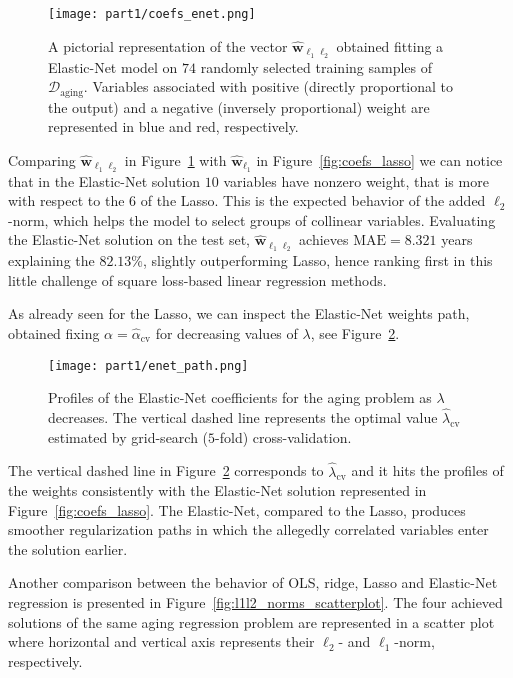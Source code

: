 			\begin{figure}[!h]
				\centering
				\texttt{[image: part1/coefs\_enet.png]}
				\caption{A pictorial representation of the vector $\bm{\hat w}_{\ell_1\ell_2}$ obtained fitting a Elastic-Net model on $74$ randomly selected training samples of $\mathcal{D}_{\text{aging}}$. Variables associated with positive (\ie directly proportional to the output) and a negative (\ie inversely proportional) weight are represented in blue and red, respectively.} \label{fig:coefs_enet}
		  \end{figure}

			Comparing $\bm{\hat w}_{\ell_1\ell_2}$ in Figure~\ref{fig:coefs_enet} with $\bm{\hat w}_{\ell_1}$ in Figure~\ref{fig:coefs_lasso} we can notice that in the Elastic-Net solution $10$ variables have nonzero weight, that is more with respect to the $6$ of the Lasso. This is the expected behavior of the added $\ell_2$-norm, which helps the model to select groups of collinear variables. Evaluating the Elastic-Net solution on the test set, $\bm{\hat w}_{\ell_1\ell_2}$ achieves $\text{MAE} = 8.321$ years explaining the $82.13\%$, slightly outperforming Lasso, hence ranking first in this little challenge of square loss-based linear regression methods.

			As already seen for the Lasso, we can inspect the Elastic-Net weights path, obtained fixing $\alpha = \hat \alpha_{\text{cv}}$ for decreasing values of $\lambda$, see Figure~\ref{fig:enet_path}.
			\begin{figure}[!h]
				\centering
				\texttt{[image: part1/enet\_path.png]}
				\caption{Profiles of the Elastic-Net coefficients for the aging problem as $\lambda$ decreases. The vertical dashed line represents the optimal value $\hat \lambda_{\text{cv}}$ estimated by grid-search ($5$-fold) cross-validation.} \label{fig:enet_path}
			\end{figure}
			The vertical dashed line in Figure~\ref{fig:enet_path} corresponds to $\hat \lambda_{\text{cv}}$ and it hits the profiles of the weights consistently with the Elastic-Net solution represented in Figure~\ref{fig:coefs_lasso}. The Elastic-Net, compared to the Lasso, produces smoother regularization paths in which the allegedly correlated variables enter the solution earlier.

			Another comparison between the behavior of OLS, ridge, Lasso and Elastic-Net regression is presented in Figure~\ref{fig:l1l2_norms_scatterplot}. The four achieved solutions of the same aging regression problem are represented in a scatter plot where horizontal and vertical axis represents their $\ell_2$- and $\ell_1$-norm, respectively.
			
